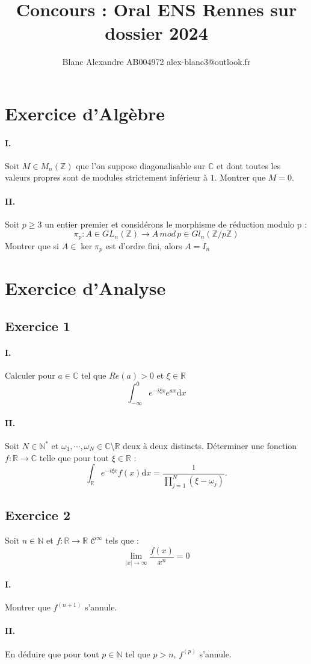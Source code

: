 \documentclass{article}
\newcommand{\partie}[1]{\section{#1}}
\newcommand{\question}[1]{\paragraph{#1}}
\begin{document}
 
\title{Concours : Oral ENS Rennes sur dossier 2024}
\author{Blanc Alexandre AB004972
alex-blanc3@outlook.fr} 

\maketitle  
\partie{Exercice d'Algèbre} 
\question{I.}
Soit $M\in M_n(\mathbb{Z})$ que l'on suppose diagonalisable sur $\mathbb{C}$ et dont toutes les valeurs propres sont de modules strictement inférieur à $1$. Montrer que $M=0$.
\question{II.}
Soit $p\geq 3$ un entier premier et considérons le morphisme de réduction modulo p :
$$\pi_p : A \in GL_n(\mathbb{Z}) \longrightarrow A \, mod \, p \in Gl_n(\mathbb{Z}/p\mathbb{Z})$$ 
Montrer que si $A\in \ker{\pi_p}$ est d'ordre fini, alors $A=I_n$ 
\partie{Exercice d'Analyse}
\subsection{Exercice 1}
\question{I.}
Calculer pour $a\in \mathbb{C}$ tel que $Re(a)>0$ et $\xi \in \mathbb{R}$ 
$$\int_{-\infty}^0 e^{-i\xi x} e^{ax} \mathrm{d} x$$
\question{II.}
Soit $N \in \mathbb{N}^*$ et $\omega_1, \cdots , \omega_N \in \mathbb{C}$\textbackslash $\mathbb{R}$ deux à deux distincts.\newline
Déterminer une fonction $f : \mathbb{R} \rightarrow \mathbb{C}$ telle que pour tout $\xi \in \mathbb{R}$ :
$$\int_{\mathbb{R}}e^{-i\xi x}f(x)\mathrm{d}x=\frac{1}{\prod_{j=1}^N(\xi - \omega_j)}.$$
\subsection{Exercice 2} 
Soit $n\in \mathbb{N}$ et $f : \mathbb{R} \rightarrow \mathbb{R}$ $\mathcal{C}^\infty$ tels que :
$$\lim_{|x|\to \infty}\frac{f(x)}{x^n} = 0$$
\question{I.}
Montrer que $f^{(n+1)}$ s'annule.
\question{II.} 
En déduire que pour tout $p\in \mathbb{N}$ tel que $p>n$, $f^{(p)}$ s'annule. 
\end{document}
